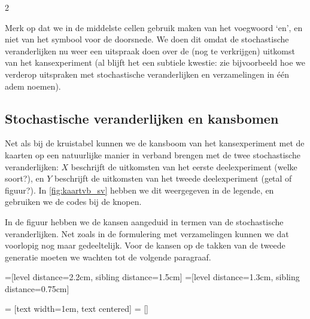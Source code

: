 \begin{multicols} {2}

Merk op dat we in de middelste cellen gebruik maken van het voegwoord ‘en’, en niet van het symbool voor de doorsnede. We doen dit omdat de stochastische veranderlijken nu weer een uitspraak doen over de (nog te verkrijgen) uitkomst van het kansexperiment (al blijft het een subtiele kwestie: zie bijvoorbeeld hoe we verderop uitspraken met stochastische veranderlijken en verzamelingen in één adem noemen).

\subsection*{Stochastische veranderlijken en kansbomen}

Net als bij de kruistabel kunnen we de kansboom van het kansexperiment met de kaarten op een natuurlijke manier in verband brengen met de twee stochastische veranderlijken: $X$ beschrijft de uitkomsten van het eerste deelexperiment (welke soort?), en $Y$ beschrijft de uitkomsten van het tweede deelexperiment (getal of figuur?). In \autoref{fig:kaartvb_sv} hebben we dit weergegeven in de legende, en gebruiken we de codes bij de knopen.

In de figuur hebben we de kansen aangeduid in termen van de stochastische veranderlijken. Net zoals in de formulering met verzamelingen kunnen we dat voorlopig nog maar gedeeltelijk. Voor de kansen op de takken van de tweede generatie moeten we wachten tot de volgende paragraaf.


=[level distance=2.2cm, sibling distance=1.5cm]
=[level distance=1.3cm, sibling distance=0.75cm]

 = [text width=1em, text centered]
 = []


\end{multicols}
